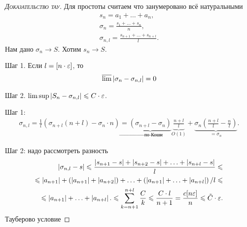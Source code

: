 \documentclass[../complex-analysis.tex]{subfiles}
\begin{document}
\begin{proof}[\normalfont\textsc{Доказательство тау}]
 Для простоты считаем что занумеровано всё натуральными
 \begin{align*}
  s_n = a_1 + \ldots + a_n, \\
  \sigma_n = \frac{s_1 + \ldots + s_n}{n},\\
  \sigma_{n,l} = \frac{s_{n+1} + \ldots + s_{n+l}}{l}.
 \end{align*} Нам дано $ \sigma_n \to S $. Хотим $ s_n \to S $.

 Шаг 1. Если $ l = [n \cdot \varepsilon] $, то 
 \begin{align*}
  \varlimsup \left| \sigma_n - \sigma_{n,l} \right| = 0
 \end{align*}

 Шаг 2. $ \limsup \left| S_n - \sigma_{n,l} \right| \leqslant C \cdot \varepsilon $.

 Шаг 1:
 \begin{align*}
  \sigma_{n,l} = \frac{1}{l}(\sigma_{n+l}(n+l) - \sigma_n \cdot n) =  \underbrace{(\sigma_{n+l} - \sigma_n)}_{\to \text{ по Коши}}\underbrace{\frac{n+l}{l}}_{O(1)} + \underbrace{\sigma_n \left( \frac{n+l}{l} - \frac{n}{l} \right)}_{=\sigma_n}.
 \end{align*}

 Шаг 2: надо рассмотреть разность 
 \begin{align*}
  \left|\sigma_{n,l} - s \right| \leqslant \frac{\left|s_{n+1} - s \right| + \left| s_{n+2} - s \right| + \ldots + \left| s_{n+l} - s \right|}{l} \leqslant \\
  \leqslant \left| a_{n+1} \right| + (\left| a_{n+1} \right| + \left| a_{n+2} \right|) + \ldots + \left( \left| a_{n+1} \right| + \ldots + \left| a_{n+l} \right| \right)/l \leqslant \\
  \leqslant \left| a_{n+1} \right| + \ldots + \left| a_{n+l} \right|. \leqslant \sum_{k=n+1}^{n+l} \frac{C}{k} \leqslant \frac{C\cdot l}{n+1} = \frac{c[n\varepsilon]}{n} \leqslant \tilde C \cdot \varepsilon.
 \end{align*} Тауберово условие
\end{proof}
\end{document}
